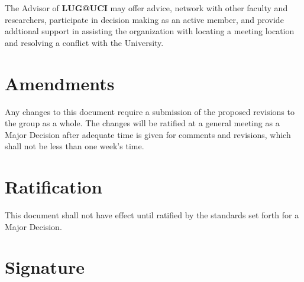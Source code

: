 \documentclass{article}
\begin{document}
The Advisor of \textbf{LUG@UCI} may offer advice, network with other faculty and
researchers, participate in decision making as an active member, and provide
addtional support in assisting the organization with locating a meeting location
and resolving a conflict with the University.

\section{Amendments}


Any changes to this document require a submission of the proposed revisions to the
group as a whole. The changes will be ratified at a general meeting as a Major Decision
after adequate time is given for comments and revisions, which shall not be less than one
week's time.

\section{Ratification}


This document shall not have effect until ratified by the standards set forth for
a Major Decision.

\section{Signature}
\end{document}
